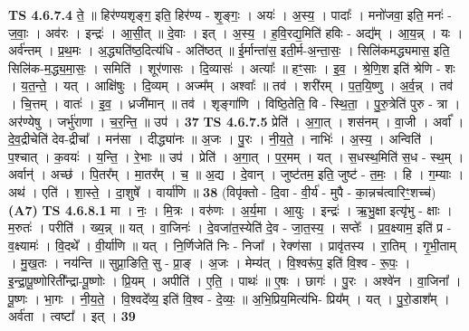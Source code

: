 \documentclass[17pt]{extarticle}
\begin{document}
                                \textbf{ TS 4.6.7.4} \newline
                  ते॒ ॥ हिर॑ण्यशृङ्ग॒ इति॒ हिर॑ण्य - शृ॒ङ्गः॒ । अयः॑ । अ॒स्य॒ । पादाः᳚ । मनो॑जवा॒ इति॒ मनः॑ - ज॒वाः॒ । अव॑रः । इन्द्रः॑ । आ॒सी॒त् ॥ दे॒वाः । इत् । अ॒स्य॒ । ह॒वि॒रद्य॒मिति॑ हविः - अद्य᳚म् । आ॒य॒न्न् । यः । अर्व॑न्तम् । प्र॒थ॒मः । अ॒द्ध्यति॑ष्ठ॒दित्य॑धि - अति॑ष्ठत् ॥ ई॒र्मान्ता॑स॒ इती॒र्म-अ॒न्ता॒सः॒ । सिलि॑कमद्ध्यमास॒ इति॒ सिलि॑क-म॒द्ध्य॒मा॒सः॒ । समिति॑ । शूर॑णासः । दि॒व्यासः॑ । अत्याः᳚ ॥ हꣳ॒॒साः । इ॒व॒ । श्रे॒णि॒श इति॑ श्रेणि - शः । य॒त॒न्ते॒ । यत् । आक्षि॑षुः । दि॒व्यम् । अज्म᳚म् । अश्वाः᳚ ॥ तव॑ । शरी॑रम् । प॒त॒यि॒ष्णु । अ॒र्व॒न्न् । तव॑ । चि॒त्तम् । वातः॑ । इ॒व॒ । ध्रजी॑मान् ॥ तव॑ । शृङ्गा॑णि । विष्ठि॒तेति॒ वि - स्थि॒ता॒ । पु॒रु॒त्रेति॑ पुरु - त्रा । अर॑ण्येषु । जर्भु॑राणा । च॒र॒न्ति॒ ॥ उप॑ । \textbf{  37} \newline
                  \newline
                                \textbf{ TS 4.6.7.5} \newline
                  प्रेति॑ । अ॒गा॒त् । शस॑नम् । वा॒जी । अर्वा᳚ । दे॒व॒द्रीचेति॑ देव-द्रीचा᳚ । मन॑सा । दीद्ध्या॑नः ॥ अ॒जः । पु॒रः । नी॒य॒ते॒ । नाभिः॑ । अ॒स्य॒ । अन्विति॑ । प॒श्चात् । क॒वयः॑ । य॒न्ति॒ । रे॒भाः ॥ उप॑ । प्रेति॑ । अ॒गा॒त् । प॒र॒मम् । यत् । स॒धस्थ॒मिति॑ स॒ध - स्थ॒म् । अर्वान्॑ । अच्छ॑ । पि॒तर᳚म् । मा॒तर᳚म् । च॒ ॥ अ॒द्य । दे॒वान् । जुष्ट॑तम॒ इति॒ जुष्ट॑ - त॒मः॒ । हि । ग॒म्याः । अथ॑ । एति॑ । शा॒स्ते॒ । दा॒शुषे᳚ । वार्या॑णि ॥ \textbf{  38} \newline
                  \newline
                      (विपृ॑क्तो - दि॒वा - वी॒र्य॑ - मुपै - का॒न्नच॑त्वारिꣳ॒॒शच्च॑)  \textbf{(A7)} \newline \newline
                                \textbf{ TS 4.6.8.1} \newline
                  मा । नः॒ । मि॒त्रः । वरु॑णः । अ॒र्य॒मा । आ॒युः । इन्द्रः॑ । ऋ॒भु॒क्षा इत्यृ॑भु - क्षाः । म॒रुतः॑ । परीति॑ । ख्य॒न्न् ॥ यत् । वा॒जिनः॑ । दे॒वजा॑त॒स्येति॑ दे॒व - जा॒त॒स्य॒ । सप्तेः᳚ । प्र॒व॒क्ष्याम॒ इति॑ प्र - व॒क्ष्यामः॑ । वि॒दथे᳚ । वी॒र्या॑णि ॥ यत् । नि॒र्णिजेति॑ निः - निजा᳚ । रेक्ण॑सा । प्रावृ॑तस्य । रा॒तिम् । गृ॒भी॒ताम् । मु॒ख॒तः । नय॑न्ति ॥ सुप्रा॒ङिति॒ सु - प्रा॒ङ् । अ॒जः । मेम्य॑त् । वि॒श्वरू॑प॒ इति॑ वि॒श्व - रू॒पः॒ । इ॒न्द्रा॒पू॒ष्णोरिती᳚न्द्रा-पू॒ष्णोः । प्रि॒यम् । अपीति॑ । ए॒ति॒ । पाथः॑ ॥ ए॒षः । छागः॑ । पु॒रः । अश्वे॑न । वा॒जिना᳚ । पू॒ष्णः । भा॒गः । नी॒य॒ते॒ । वि॒श्वदे᳚व्य॒ इति॑ वि॒श्व - दे॒व्यः॒ ॥ अ॒भि॒प्रिय॒मित्य॑भि- प्रिय᳚म् । यत् । पु॒रो॒डाश᳚म् । अर्व॑ता । त्वष्टा᳚ । इत् । \textbf{  39} \newline
\end{document}
